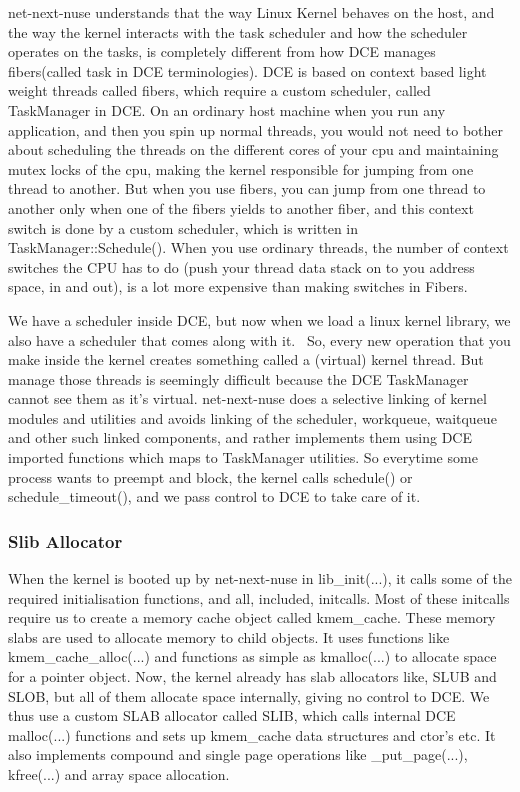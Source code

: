 \documentclass{sig-alternate}
\begin{document}
net-next-nuse understands that the way Linux Kernel behaves on the host, and the way the kernel interacts with the task 
scheduler and how the scheduler operates on the tasks, is completely different from how DCE manages fibers(called task in DCE terminologies). 
DCE is based on context based light weight threads called fibers, which require a custom scheduler, called TaskManager in DCE. On an ordinary
host machine when you run any application, and then you spin up normal threads, you would not need to bother about scheduling the threads on 
the different cores of your cpu and maintaining mutex locks of the cpu, making the kernel responsible for jumping from one thread to another. 
But when you use fibers, you can jump from one thread to another only when one of the fibers yields to another fiber, and this context switch 
is done by a custom scheduler, which is written in TaskManager::Schedule(). When you use ordinary threads, the number of context switches the 
CPU has to do (push your thread data stack on to you address space, in and out), is a lot more expensive than making switches in Fibers.

We have a scheduler inside DCE, but now when we load a linux kernel library, we also have a scheduler that comes along with it. \
So, every new operation that you make inside the kernel creates something called a (virtual) kernel thread. But manage those threads is seemingly 
difficult because the DCE TaskManager cannot see them as it’s virtual. net-next-nuse does a selective linking of 
kernel modules and utilities and avoids linking of the scheduler, workqueue, waitqueue and other such linked components, and rather implements 
them using DCE imported functions which maps to TaskManager utilities. So everytime some process wants to preempt and block, the kernel calls 
schedule() or schedule\_timeout(), and we pass control to DCE to take care of it. 

\subsubsection{Slib Allocator}
When the kernel is booted up by net-next-nuse in lib\_init(...), it calls some of the required initialisation functions, and all, included, initcalls. 
Most of these initcalls require us to create a memory cache object called kmem\_cache. These memory slabs are used to allocate memory to child 
objects. It uses functions like kmem\_cache\_alloc(...) and functions as simple as kmalloc(...) to allocate space for a pointer object. Now, the 
kernel already has slab allocators like, SLUB and SLOB, but all of them allocate space internally, giving no control to DCE. We thus use a custom 
SLAB allocator called SLIB, which calls internal DCE malloc(...) functions and sets up kmem\_cache data structures and ctor’s etc. It also 
implements compound and single page operations like \_put\_page(...), kfree(...)  and array space allocation. 
\end{document}
